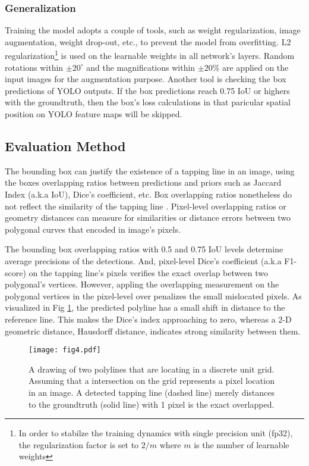 \documentclass[default,pdflatex,iicol]{sn-jnl}%
\begin{document}
\subsubsection{Generalization}
Training the model adopts a couple of tools, such as weight regularization, image augmentation, weight drop-out, etc., to prevent the model from overfitting. L2 regularization\footnote[2]{In order to stabilze the training dynamics with single precision unit (fp32), the regularization factor is set to $2/m$ where $m$ is the number of learnable weights} is used on the learnable weights in all network's layers. Random rotations within $\pm20^\circ$ and the magnifications within $\pm20\%$ are applied on the input images for the augmentation purpose. Another tool is checking the box predictions of YOLO outputs. If the box predictions reach 0.75 IoU or highers with the groundtruth, then the box's loss calculations in that paricular spatial position on YOLO feature maps will be skipped.

\subsection{Evaluation Method}
The bounding box can justify the existence of a tapping line in an image, using the boxes overlapping ratios between predictions and priors such as Jaccard Index (a.k.a IoU), Dice's coefficient, etc. Box overlapping ratios nonetheless do not reflect the similarity of the tapping line \cite{Wongtanawijit_2021}. Pixel-level overlapping ratios or geometry distances can measure for similarities or distance errors between two polygonal curves that encoded in image's pixels.

The bounding box overlapping ratios with 0.5 and 0.75 IoU levels determine average precisions of the detections. And, pixel-level Dice's coefficient (a.k.a F1-score) on the tapping line's pixels verifies the exact overlap between two polygonal's vertices. However, appling the overlapping measurement on the polygonal vertices in the pixel-level over penalizes the small mislocated pixels. As visualized in Fig \ref{fig4-polyline}, the predicted polyline has a small shift in distance to the reference line. This makes the Dice's index approaching to zero, whereas a 2-D geometric distance, Hausdorff distance, indicates strong similarity between them.

\begin{figure}[h]%
\centering
\texttt{[image: fig4.pdf]}
\caption{A drawing of two polylines that are locating in a discrete unit grid. Assuming that a intersection on the grid represents a pixel location in an image. A detected tapping line (dashed line) merely distances to the groundtruth (solid line) with 1 pixel is the exact overlapped.}\label{fig4-polyline}
\end{figure}
\end{document}
